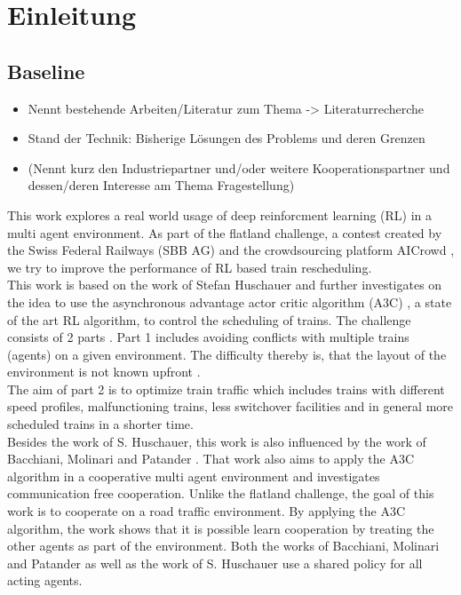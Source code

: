 \chapter{Einleitung}\label{chap.einleitung}
\section{Baseline}\label{baseline}
\begin{itemize}
\item Nennt bestehende Arbeiten/Literatur zum Thema -> Literaturrecherche
\item Stand der Technik: Bisherige Lösungen des Problems und deren Grenzen
\item (Nennt kurz den Industriepartner und/oder weitere Kooperationspartner und dessen/deren Interesse am Thema Fragestellung)
\end{itemize}
This work explores a real world usage of deep reinforcment learning (RL) in a multi agent environment. As part of the flatland challenge, a contest created by the Swiss Federal Railways (SBB AG) and the crowdsourcing platform AICrowd \cite{aicrowd}, we try to improve the performance of RL based train rescheduling.\\
This work is based on the work of Stefan Huschauer \cite{flatlandstephan} and further investigates on the idea to use the asynchronous advantage actor critic algorithm (A3C) \cite{a3c}, a state of the art RL algorithm, to control the scheduling of trains.
The challenge consists of 2 parts \cite{aicrowd}.  
Part 1 includes avoiding conflicts with multiple trains (agents) on a given environment. The difficulty thereby is, that the layout of the environment is not known upfront .\\
The aim of part 2 is to optimize train traffic which includes trains with different speed profiles, malfunctioning trains, less switchover facilities and in general more scheduled trains in a shorter time.\\
Besides the work of S. Huschauer, this work is also influenced by the work of Bacchiani, Molinari and Patander \cite{marltraffica3c}. That work also aims to apply the A3C algorithm in a cooperative multi agent environment and investigates communication free cooperation.
Unlike the flatland challenge, the goal of this work is to cooperate on a road traffic environment. By applying the A3C algorithm, the work shows that it is possible learn cooperation by treating the other agents as part of the environment. Both the works of Bacchiani, Molinari and Patander as well as the work of S. Huschauer use a shared policy for all acting agents.

